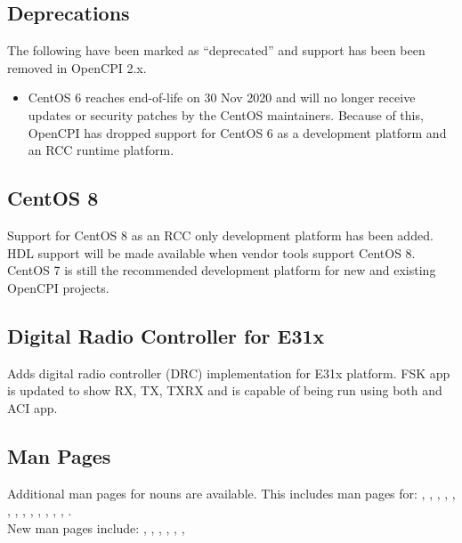 \subsection{Deprecations}
\label{sec:20_deprecations}
The following have been marked as ``deprecated'' and support has been been removed in OpenCPI 2.x.
\begin{itemize}
\item CentOS 6 reaches end-of-life on 30 Nov 2020 and will no longer receive updates or security patches by the CentOS maintainers. Because of this, OpenCPI has dropped support for CentOS 6 as a development platform and an RCC runtime platform.
\end{itemize}

\subsection{CentOS 8}
\label{sec:20_centos8}
Support for CentOS 8 as an RCC only development platform has been added. HDL support will be made available when vendor tools support CentOS 8. CentOS 7 is still the recommended development platform for new and existing OpenCPI projects.

\subsection{Digital Radio Controller for E31x}
\label{sec:20_digital_radio}
Adds digital radio controller (DRC) implementation for E31x platform. FSK app  is updated to show RX, TX, TXRX and is capable of being run using both  and ACI app.

\subsection{Man Pages}
\label{sec:20_man_pages}
Additional man pages for  nouns are available. This includes man pages for: , , , , , , , , , , , , , .\\

New man pages include: , , , , , , \\

